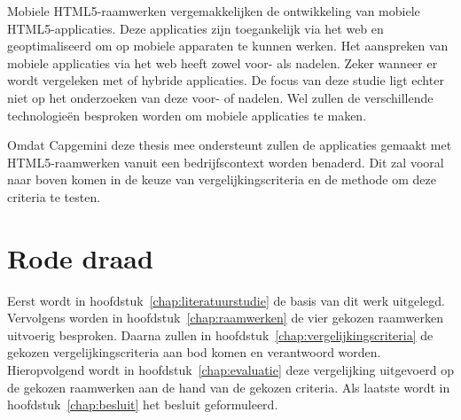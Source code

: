 Mobiele HTML5-raamwerken vergemakkelijken de ontwikkeling van mobiele HTML5-applicaties.
Deze applicaties zijn toegankelijk via het web en geoptimaliseerd om op mobiele apparaten te kunnen werken.
Het aanspreken van mobiele applicaties via het web heeft zowel voor- als nadelen.
Zeker wanneer er wordt vergeleken met  of hybride applicaties.
De focus van deze studie ligt echter niet op het onderzoeken van deze voor- of nadelen.
Wel zullen de verschillende technologieën besproken worden om mobiele applicaties te maken.

Omdat Capgemini deze thesis mee ondersteunt zullen de applicaties gemaakt met HTML5-raamwerken vanuit een bedrijfscontext worden benaderd.
Dit zal vooral naar boven komen in de keuze van vergelijkingscriteria en de methode om deze criteria te testen.


\section{Rode draad}
Eerst wordt in hoofdstuk~\ref{chap:literatuurstudie} de basis van dit werk uitgelegd.
Vervolgens worden in hoofdstuk~\ref{chap:raamwerken} de vier gekozen raamwerken uitvoerig besproken.
Daarna zullen in hoofdstuk~\ref{chap:vergelijkingscriteria} de gekozen vergelijkingscriteria aan bod komen en verantwoord worden.
Hieropvolgend wordt in hoofdstuk~\ref{chap:evaluatie} deze vergelijking uitgevoerd op de gekozen raamwerken aan de hand van de gekozen criteria.
Als laatste wordt in hoofdstuk~\ref{chap:besluit} het besluit geformuleerd.

